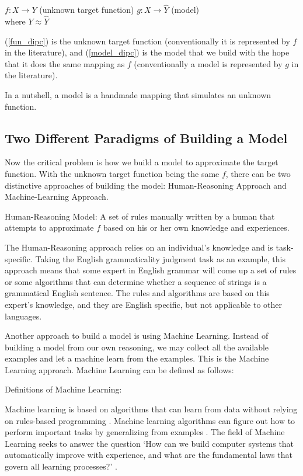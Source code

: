 \begin{exe}
\ex 
	\begin{xlist}
	\ex \label{fun_dipc} $f: X \rightarrow Y$ (unknown target function)
	\ex \label{model_dipc}$g: X \rightarrow \hat{Y}$ (model)\\
	where $Y \approx \hat{Y}$ 
	\end{xlist}
\end{exe}

(\ref{fun_dipc}) is the unknown target function (conventionally it is represented by $f$ in the literature), and (\ref{model_dipc}) is the model that we build with the hope that it does the same mapping as $f$ (conventionally a model is represented by $g$ in the literature).

In a nutshell, a model is a handmade mapping that simulates an unknown function. 

\subsection{Two Different Paradigms of Building a Model}

Now the critical problem is how we build a model to approximate the target function. With the unknown target function being the same $f$, there can be two distinctive approaches of building the model: Human-Reasoning Approach and Machine-Learning Approach. 

\begin{exe}
\ex Human-Reasoning Model:
A set of rules manually written by a human that attempts to approximate $f$ based on his or her own knowledge and experiences. 
\end{exe}

The Human-Reasoning approach relies on an individual's knowledge and is task-specific. 
Taking the English grammaticality judgment task as an example, this approach means that some expert in English grammar will come up a set of rules or some algorithms that can determine whether a sequence of strings is a grammatical English sentence. 
The rules and algorithms are based on this expert's knowledge, and they are English specific, but not applicable to other languages.     

Another approach to build a model is using Machine Learning. Instead of building a model from our own reasoning, we may collect all the available examples and let a machine learn from the examples. This is the Machine Learning approach. 
Machine Learning can be defined as follows:

\begin{exe}
\ex Definitions of Machine Learning:
\begin{xlist}
	\ex Machine learning is based on algorithms that can learn from data without relying on rules-based programming \citep{pyle2015executive}. 
	\ex Machine learning algorithms can figure out how to perform important tasks by generalizing from examples \citep{domingos2012few}.
	\ex The field of Machine Learning seeks to answer the question `How can we build computer systems that automatically improve with experience, and what are the fundamental laws that govern all learning processes?' \citep{mitchell2006discipline}.
\end{xlist}
\end{exe}   

